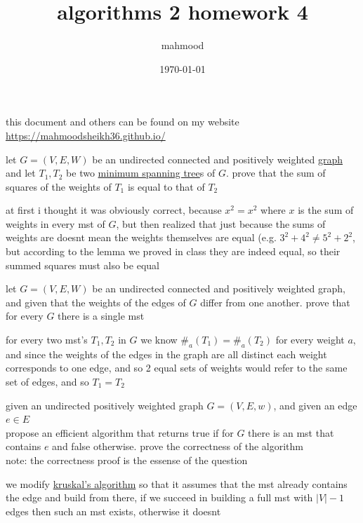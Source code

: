 \documentclass[a4paper,12pt]{article}
\author{mahmood}
\date{\today}
\title{algorithms 2 homework 4}
\begin{document}
\maketitle
\begin{note}
this document and others can be found on my website\\
\url{https://mahmoodsheikh36.github.io/}
\end{note}
\begin{question}
let \(G=(V,E,W)\) be an undirected connected and positively weighted \href{20230314001051-graph.org}{graph} and let \(T_1,T_2\) be two \href{20230508180506-minimum_weight_spanning_tree.org}{minimum spanning tree}s of \(G\). prove that the sum of squares of the weights of \(T_1\) is equal to that of \(T_2\)\\
\begin{answer}
at first i thought it was obviously correct, because \(x^2=x^2\) where \(x\) is the sum of weights in every mst of \(G\), but then realized that just because the sums of weights are doesnt mean the weights themselves are equal (e.g. \(3^2+4^2 \neq 5^2+2^2\), but according to the lemma we proved in class they are indeed equal, so their summed squares must also be equal\\
\end{answer}
\end{question}
\begin{question}
let \(G=(V,E,W)\) be an undirected connected and positively weighted graph, and given that the weights of the edges of \(G\) differ from one another. prove that for every \(G\) there is a single mst\\
\begin{answer}

for every two mst's \(T_1,T_2\) in \(G\) we know \(\#_a(T_1) = \#_a(T_2)\) for every weight \(a\), and since the weights of the edges in the graph are all distinct each weight corresponds to one edge, and so 2 equal sets of weights would refer to the same set of edges, and so \(T_1=T_2\)\\
\end{answer}
\end{question}
\begin{question}
given an undirected positively weighted graph \(G=(V,E,w)\), and given an edge \(e \in E\)\\
propose an efficient algorithm that returns true if for \(G\) there is an mst that contains \(e\) and false otherwise. prove the correctness of the algorithm\\
note: the correctness proof is the essense of the question\\
\begin{answer}
we modify \href{20230515173032-kruksal_s_algorithm.org}{kruskal's algorithm} so that it assumes that the mst already contains the edge and build from there, if we succeed in building a full mst with \(|V|-1\) edges then such an mst exists, otherwise it doesnt\\
\\
\end{answer}
\end{question}
\end{document}
